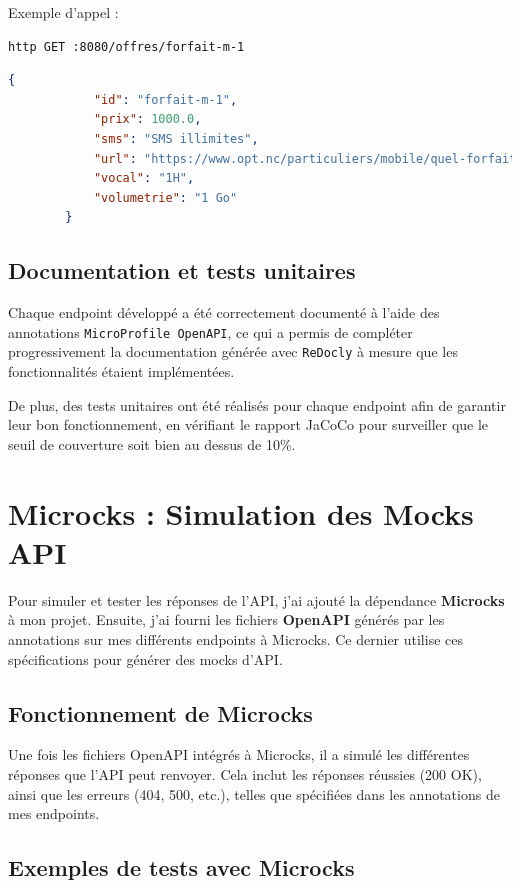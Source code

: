 \documentclass{article}
\begin{document}
	
		Exemple d'appel :
	\begin{lstlisting}[language=bash]
		http GET :8080/offres/forfait-m-1
	\end{lstlisting}
	\begin{lstlisting}[language=JSON]
		{
			"id": "forfait-m-1",
			"prix": 1000.0,
			"sms": "SMS illimites",
			"url": "https://www.opt.nc/particuliers/mobile/quel-forfait-choisir/forfait-m-1-go",
			"vocal": "1H",
			"volumetrie": "1 Go"
		}

	\end{lstlisting}
	
	
	
	
	\subsection{Documentation et tests unitaires}
	
	Chaque endpoint développé a été correctement documenté à l'aide des annotations \texttt{MicroProfile OpenAPI}, ce qui a permis de compléter progressivement la documentation générée avec \texttt{ReDocly} à mesure que les fonctionnalités étaient implémentées.
	
	De plus, des tests unitaires ont été réalisés pour chaque endpoint afin de garantir leur bon fonctionnement, en vérifiant le rapport JaCoCo pour surveiller que le seuil de couverture soit bien au dessus de 10\%.
	
	\section{Microcks : Simulation des Mocks API}
	
	Pour simuler et tester les réponses de l'API, j'ai ajouté la dépendance \textbf{Microcks} à mon projet. Ensuite, j'ai fourni les fichiers \textbf{OpenAPI} générés par les annotations sur mes différents endpoints à Microcks. Ce dernier utilise ces spécifications pour générer des mocks d'API.
	
	\subsection*{Fonctionnement de Microcks}
	
	Une fois les fichiers OpenAPI intégrés à Microcks, il a simulé les différentes réponses que l'API peut renvoyer. Cela inclut les réponses réussies (200 OK), ainsi que les erreurs (404, 500, etc.), telles que spécifiées dans les annotations de mes endpoints.
	
	\subsection*{Exemples de tests avec Microcks}
	
\end{document}
